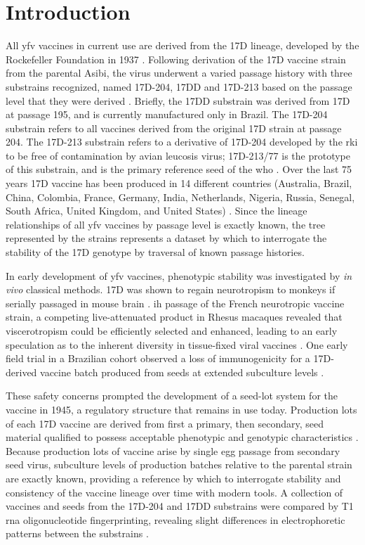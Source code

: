 \section{Introduction}
All \gls{yfv} vaccines in current use are derived from the 17D lineage, developed by the Rockefeller Foundation in 1937 \parencite{Theiler:1937wy,Theiler:1951ti}. Following derivation of the 17D vaccine strain from the parental Asibi, the virus underwent a varied passage history with three substrains recognized, named 17D-204, 17DD and 17D-213 based on the passage level that they were derived \parencite{WorldHealthOrganization:2010wo}. Briefly, the 17DD substrain was derived from 17D at passage 195, and is currently manufactured only in Brazil. The 17D-204 substrain refers to all vaccines derived from the original 17D strain at passage 204. The 17D-213 substrain refers to a derivative of 17D-204 developed by the \gls{rki} to be free of contamination by avian leucosis virus; 17D-213/77 is the prototype of this substrain, and is the primary reference seed of the \gls{who} \parencite{Bres:1987wl}. Over the last 75 years 17D vaccine has been produced in 14 different countries (Australia, Brazil, China, Colombia, France, Germany, India, Netherlands, Nigeria, Russia, Senegal, South Africa, United Kingdom, and United States) \parencite{Monath:2013cu}. Since the lineage relationships of all \gls{yfv} vaccines by passage level is exactly known, the tree represented by the strains represents a dataset by which to interrogate the stability of the 17D genotype by traversal of known passage histories.

In early development of \gls{yfv} vaccines, phenotypic stability was investigated by \emph{in vivo} classical methods. 17D was shown to regain neurotropism to monkeys if serially passaged in mouse brain \parencite[129]{Theiler:1951ti}. \Gls{ih} passage of the French neurotropic vaccine strain, a competing live-attenuated product in Rhesus macaques revealed that viscerotropism could be efficiently selected and enhanced, leading to an early speculation as to the inherent diversity in tissue-fixed viral vaccines \parencite{FINDLAY:1935vu}. One early field trial in a Brazilian cohort observed a loss of immunogenicity for a 17D-derived vaccine batch produced from seeds at extended subculture levels \parencite{Soper:1938tb}. 

These safety concerns prompted the development of a seed-lot system for the vaccine in 1945, a regulatory structure that remains in use today. Production lots of each 17D vaccine are derived from first a primary, then secondary, seed material qualified to possess acceptable phenotypic and genotypic characteristics \parencite{WorldHealthOrganization:2010wo}. Because production lots of vaccine arise by single egg passage from secondary seed virus, subculture levels of production batches relative to the parental strain are exactly known, providing a reference by which to interrogate stability and consistency of the vaccine lineage over time with modern tools. A collection of vaccines and seeds from the 17D-204 and 17DD substrains were compared by T1 \gls{rna} oligonucleotide fingerprinting, revealing slight differences in electrophoretic patterns between the substrains \parencite{Monath:1983uk}. 

